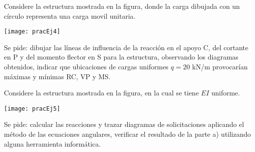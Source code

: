 \ejercicio
%
Considere la estructura mostrada en la figura, donde la carga dibujada con un círculo representa una carga movil unitaria.
%
\begin{center}
	\texttt{[image: pracEj4]}
\end{center}
%
\noindent
Se pide:
\parte dibujar las líneas de influencia de la reacción en el apoyo C, del cortante en P y del momento flector en S para la estructura,
\parte observando los diagramas obtenidos, indicar que ubicaciones de cargas uniformes $q=20$ kN/m provocarían máximas y mínimas RC, VP y MS.
%



\ejercicio
Considere la estructura mostrada en la figura, en la cual se tiene $EI$ uniforme.
%
\begin{center}
	\texttt{[image: pracEj5]}
\end{center}
%
\noindent
Se pide:
\parte calcular las reacciones y trazar diagramas de solicitaciones aplicando el método de las ecuaciones angulares, 
\parte verificar el resultado de la parte a) utilizando alguna herramienta informática.

